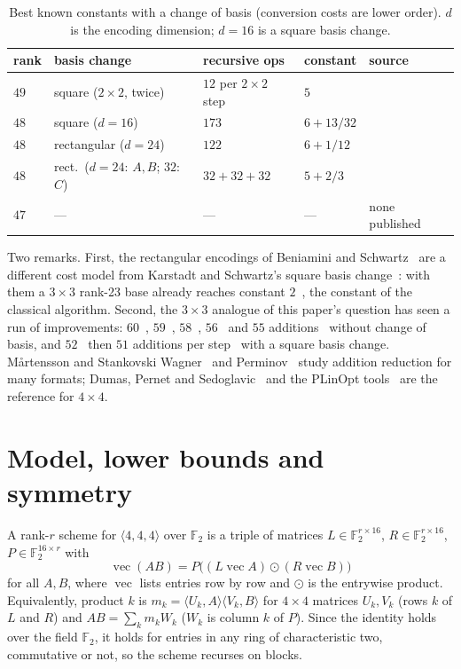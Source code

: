 \documentclass[11pt]{article}
\theoremstyle{remark}
\newcommand{\F}{\mathbb{F}}
\begin{document}
\begin{table}[ht]
\centering
\caption{Best known constants with a change of basis (conversion
costs are lower order).  $d$ is the encoding dimension; $d=16$ is a
square basis change.}\label{tab:alt}
\small
\begin{tabular}{lllll}
\toprule
rank & basis change & recursive ops & constant & source \\
\midrule
$49$ & square ($2\times2$, twice) & $12$ per $2\times2$ step & $5$ & \cite{KS17} \\
$48$ & square ($d=16$) & $173$ & $6+13/32$ & \cite{DPSST26} \\
$48$ & rectangular ($d=24$) & $122$ & $6+1/12$ & \cite{DPSST26} \\
$48$ & rect.\ ($d=24$: $A,B$; $32$: $C$) & $32+32+32$ & $5+2/3$ & \cite{DPSST26} \\
$47$ & --- & --- & --- & none published \\
\bottomrule
\end{tabular}
\end{table}

Two remarks.  First, the rectangular encodings of Beniamini and
Schwartz~\cite{BS19,BCHKS20} are a different cost model from
Karstadt and Schwartz's square basis change~\cite{KS17}: with them a
$3\times3$ rank-23 base already reaches constant $2$~\cite{BS19}, the
constant of the classical algorithm.  Second, the $3\times3$ analogue
of this paper's question has seen a run of improvements:
$60$~\cite{Stapleton25}, $59$~\cite{MSWS26}, $58$~\cite{Perminov25a},
$56$~\cite{Sun26} and
$55$ additions~\cite{Sidebottom26a,KI26} without change of basis, and
$52$~\cite{Nielsen26} then $51$ additions per step~\cite{SP26,Sidebottom26b}
with a square basis change.  M{\aa}rtensson and Stankovski
Wagner~\cite{MW24,MW26} and Perminov~\cite{Perminov25b} study
addition reduction for many formats; Dumas, Pernet and
Sedoglavic~\cite{DPS25,DPS26a,DPSST26} and the PLinOpt
tools~\cite{PLinOpt} are the reference for $4\times4$.

\section{Model, lower bounds and symmetry}\label{sec:model}

A rank-$r$ scheme for $\langle4,4,4\rangle$ over $\F_2$ is a triple of
matrices $L\in\F_2^{r\times16}$, $R\in\F_2^{r\times16}$,
$P\in\F_2^{16\times r}$ with
\[
\operatorname{vec}(AB) = P\bigl((L\operatorname{vec}A)\odot(R\operatorname{vec}B)\bigr)
\]
for all $A,B$, where $\operatorname{vec}$ lists entries row by row and
$\odot$ is the entrywise product.  Equivalently, product $k$ is
$m_k=\langle U_k,A\rangle\langle V_k,B\rangle$ for $4\times4$ matrices
$U_k,V_k$ (rows $k$ of $L$ and $R$) and $AB=\sum_k m_kW_k$ ($W_k$ is
column $k$ of $P$).  Since the identity holds over the field $\F_2$, it
holds for entries in any ring of characteristic two, commutative or not,
so the scheme recurses on blocks.
\end{document}
